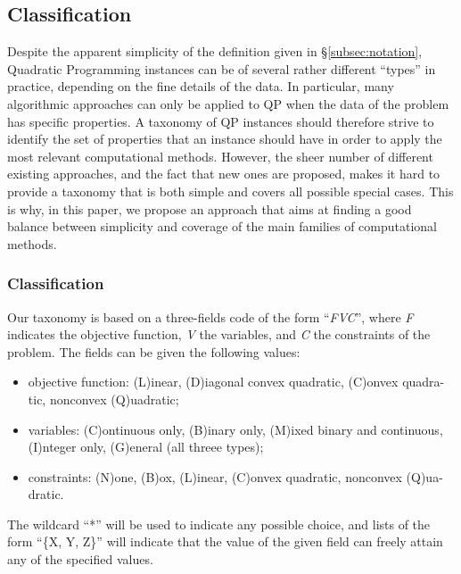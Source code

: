 

\subsection{Classification}\label{sec:classification}

Despite the apparent simplicity of the definition given in \S \ref{subsec:notation}, Quadratic Programming instances can be of several rather different ``types'' in practice, depending on the fine details of the data. In particular, many algorithmic approaches can only be applied to QP when the data of the problem has specific properties. A taxonomy of QP instances should therefore strive to identify the set of properties that an instance should have in order to apply the most relevant computational methods. However, the sheer number of different existing approaches, and the fact that new ones are proposed, makes it hard to provide a taxonomy that is both simple and covers all possible special cases. This is why, in this paper, we propose an approach that aims at finding a good balance between simplicity and coverage of the main families of computational methods.

\subsubsection{Classification}\label{ssec:taxonomy}

Our taxonomy is based on a three-fields code of the form ``\textit{FVC}'', where \textit{F} indicates the objective function, \textit{V} the variables, and \textit{C} the constraints of the problem. The fields can be given the following values:
%
\begin{itemize}
 \item objective function: (L)inear, (D)iagonal convex quadratic, (C)onvex quadra-tic, nonconvex (Q)uadratic;
 \item variables: (C)ontinuous only, (B)inary only, (M)ixed binary and continuous, (I)nteger only, (G)eneral (all threee types);
 \item constraints: (N)one, (B)ox, (L)inear, (C)onvex quadratic, nonconvex (Q)ua-dratic.
\end{itemize}
%
The wildcard ``*'' will be used to indicate any possible choice, and lists of the form ``\{X, Y, Z\}'' will indicate that the value of the given field can freely attain any of the specified values.

